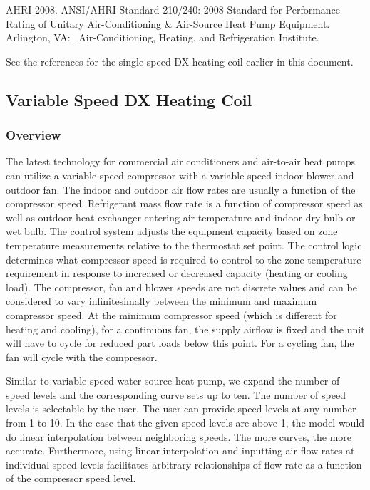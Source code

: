 AHRI 2008. ANSI/AHRI Standard 210/240: 2008 Standard for Performance Rating of Unitary Air-Conditioning \& Air-Source Heat Pump Equipment.~ Arlington, VA:~ Air-Conditioning, Heating, and Refrigeration Institute.

See the references for the single speed DX heating coil earlier in this document.

\subsection{Variable Speed DX Heating Coil}\label{variable-speed-dx-heating-coil}

\subsubsection{Overview}\label{overview-8-000}

The latest technology for commercial air conditioners and air-to-air heat pumps can utilize a variable speed compressor with a variable speed indoor blower and outdoor fan. The indoor and outdoor air flow rates are usually a function of the compressor speed. Refrigerant mass flow rate is a function of compressor speed as well as outdoor heat exchanger entering air temperature and indoor dry bulb or wet bulb. The control system adjusts the equipment capacity based on zone temperature measurements relative to the thermostat set point. The control logic determines what compressor speed is required to control to the zone temperature requirement in response to increased or decreased capacity (heating or cooling load). The compressor, fan and blower speeds are not discrete values and can be considered to vary infinitesimally between the minimum and maximum compressor speed. At the minimum compressor speed (which is different for heating and cooling), for a continuous fan, the supply airflow is fixed and the unit will have to cycle for reduced part loads below this point. For a cycling fan, the fan will cycle with the compressor.

Similar to variable-speed water source heat pump, we expand the number of speed levels and the corresponding curve sets up to ten. The number of speed levels is selectable by the user. The user can provide speed levels at any number from 1 to 10. In the case that the given speed levels are above 1, the model would do linear interpolation between neighboring speeds. The more curves, the more accurate. Furthermore, using linear interpolation and inputting air flow rates at individual speed levels facilitates arbitrary relationships of flow rate as a function of the compressor speed level.

